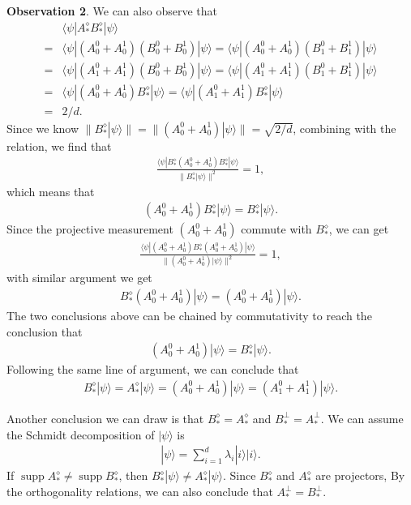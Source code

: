 \documentclass[11pt,letterpaper]{article}
\newcommand{\ket}[1]{|#1\rangle}
\newcommand{\bra}[1]{\langle#1|}
\DeclareMathOperator{\supp}{supp}
\newcommand{\1}{\mathbb{1}}
\theoremstyle{definition}
\begin{document}
\textbf{Observation 2}. We can also observe that
\begin{align}
	&\bra{\psi}A_\ast^\diamond B_\ast^\diamond\ket{\psi}\\
	=&\bra{\psi} (A_0^0+A_0^1)(B_0^0+B_0^1) \ket{\psi} =\bra{\psi} (A_0^0+A_0^1)(B_1^0+B_1^1) \ket{\psi}\\
	=&\bra{\psi} (A_1^0+A_1^1)(B_0^0+B_0^1) \ket{\psi} =\bra{\psi} (A_1^0+A_1^1)(B_1^0+B_1^1) \ket{\psi}\\
	=& \bra{\psi} (A_0^0+A_0^1)B_\ast^\diamond \ket{\psi} = \bra{\psi} (A_1^0+A_1^1)B_\ast^\diamond \ket{\psi}\\
	= &2/d.
\end{align}
Since we know $\| B_\ast^\diamond \ket{\psi} \| = \| (A_0^0+A_0^1) \ket{\psi}\| = \sqrt{2/d}$,
combining with the relation, we find that 
\begin{align}
	\frac{\bra{\psi}B_\ast^\diamond (A_0^0+A_0^1) B_\ast^\diamond\ket{\psi}}{ \| B_\ast^\diamond \ket{\psi} \|^2} = 1,
\end{align}
which means that 
\begin{align}
	(A_0^0+A_0^1)B_\ast^\diamond \ket{\psi} = B_\ast^\diamond \ket{\psi}.
\end{align}
Since the projective measurement $(A_0^0+A_0^1)$ commute with $B_\ast^\diamond$, we can get
\begin{align}
	\frac{\bra{\psi} (A_0^0+A_0^1) B_\ast^\diamond(A_0^0+A_0^1)\ket{\psi}}{ \| (A_0^0+A_0^1) \ket{\psi} \|^2} = 1,
\end{align}
with similar argument we get 
\begin{align}
	B_\ast^\diamond (A_0^0+A_0^1) \ket{\psi} = (A_0^0+A_0^1)\ket{\psi}.
\end{align}
The two conclusions above can be chained by commutativity to reach the conclusion that 
\begin{align}
	(A_0^0+A_0^1)\ket{\psi} = B_\ast^\diamond \ket{\psi}.
\end{align}
Following the same line of argument, we can conclude that
\begin{align}
	B_\ast^\diamond \ket{\psi} = A_\ast^\diamond \ket{\psi} = (A_0^0+A_0^1)\ket{\psi} = (A_1^0+A_1^1)\ket{\psi}.
\end{align}

Another conclusion we can draw is that $B_\ast^\diamond = A_\ast^\diamond$ and $B_\ast^\perp = A_\ast^\perp$.
We can assume the Schmidt decomposition of $\ket{\psi}$ is
\begin{align}
	\ket{\psi} = \sum_{i=1}^d \lambda_i \ket{i}\ket{i}.
\end{align}
If $\supp{A_\ast^\diamond} \neq \supp{B_\ast^\diamond}$, then $B_\ast^\diamond\ket{\psi} \neq A_\ast^\diamond\ket{\psi}$. Since $B_\ast^\diamond$ and $A_\ast^\diamond$ are projectors,
By the orthogonality relations, we can also conclude that $A_\ast^\perp = B_\ast^\perp$.
\end{document}
